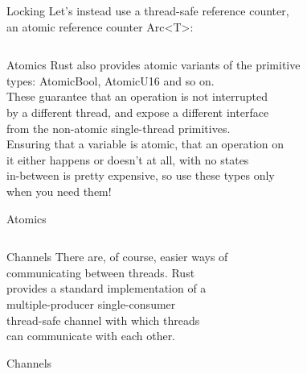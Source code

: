 \documentclass[usenames,dvipsnames,10pt,aspectratio=169]{beamer}
\begin{document}
\begin{frame}{Locking}
	\normalsize
	Let's instead use a thread-safe reference counter,\\
	an atomic reference counter \textcolor{ucuyellow}{Arc<T>}:
	\inputminted[fontsize=\scriptsize]{rust}{code/mutex4.rs}
	\vspace{0.4cm}
\end{frame}

\begin{frame}{Atomics}
	Rust also provides atomic variants of the primitive\\
	types: \textcolor{ucuyellow}{AtomicBool}, \textcolor{ucuyellow}{AtomicU16} and so on.\\
	\vspace{0.2cm}
	These guarantee that an operation is not interrupted\\
	by a different thread, and expose a different interface\\
	from the non-atomic single-thread primitives.\\
	\vspace{0.2cm}
	Ensuring that a variable is atomic, that an operation on\\
	it either happens or doesn't at all, with no states\\
	in-between is pretty expensive, so use these types only\\
	when you need them!
\end{frame}

\begin{frame}{Atomics}
	\inputminted[fontsize=\normalsize]{rust}{code/atomics1.rs}
	\vspace{0.2cm}
\end{frame}

\begin{frame}{Channels}
	\Large
	There are, of course, easier ways of\\
	communicating between threads. Rust\\
	provides a standard implementation of a\\
	multiple-producer single-consumer\\
	thread-safe channel with which threads\\
	can communicate with each other.
\end{frame}

\begin{frame}{Channels}
	\normalsize
	\inputminted[fontsize=\large]{rust}{code/mpsc1.rs}
	\vspace{0.4cm}
\end{frame}
\end{document}
